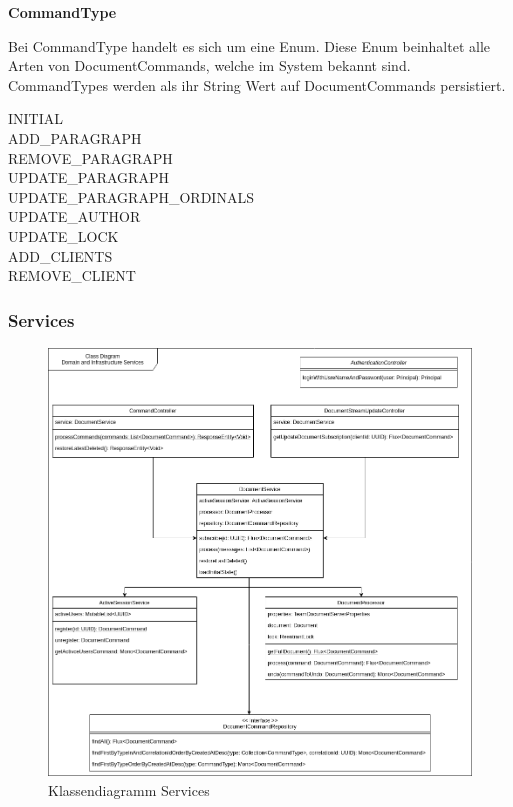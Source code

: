 \textbf{CommandType}

Bei CommandType handelt es sich um eine Enum.
Diese Enum beinhaltet alle Arten von DocumentCommands, welche im System bekannt sind.
CommandTypes werden als ihr String Wert auf DocumentCommands persistiert.

INITIAL \\
ADD\_PARAGRAPH \\
REMOVE\_PARAGRAPH \\
UPDATE\_PARAGRAPH \\
UPDATE\_PARAGRAPH\_ORDINALS \\
UPDATE\_AUTHOR \\
UPDATE\_LOCK \\
ADD\_CLIENTS \\
REMOVE\_CLIENT \\

\clearpage

\subsubsection{Services}

\begin{figure}[h]
    \centering
    \begin{minipage}[b]{0.8\textwidth}
        \includegraphics[width=\textwidth]{graphics/class-be.drawio}
        \caption{Klassendiagramm Services}
    \end{minipage}
\end{figure}

